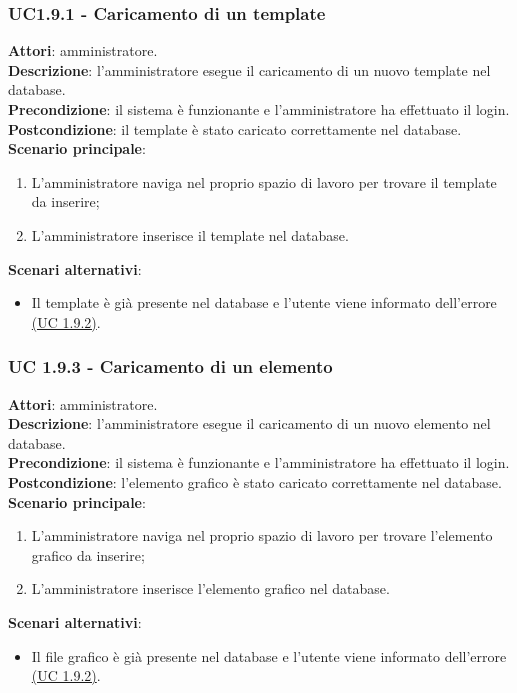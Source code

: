 \subsubsection{UC1.9.1 - Caricamento di un template}{
	\label{uc1.9.1}
	\textbf{Attori}: amministratore. \\
	\textbf{Descrizione}: l'amministratore esegue il caricamento di un nuovo template nel database. \\
	\textbf{Precondizione}: il sistema  è funzionante e l'amministratore ha effettuato il login.	\\
	\textbf{Postcondizione}: il template è stato caricato correttamente nel database.	\\
	\textbf{Scenario principale}:
	\begin{enumerate}
		\item L'amministratore naviga nel proprio spazio di lavoro  per trovare il template da inserire;
		\item L'amministratore inserisce il template nel database.
	\end{enumerate}
	\textbf{Scenari alternativi}:
	\begin{itemize}
		\item Il template è già presente nel database e l'utente viene informato dell'errore \hyperref[uc1.9.2]{(UC 1.9.2)}.
	\end{itemize}
	}
\subsubsection{UC 1.9.3 - Caricamento di un elemento}{
	\label{uc1.9.3}
	\textbf{Attori}: amministratore. \\
	\textbf{Descrizione}: l'amministratore esegue il caricamento di un nuovo elemento nel database. \\
	\textbf{Precondizione}: il sistema  è funzionante e l'amministratore ha effettuato il login.	\\
	\textbf{Postcondizione}: l'elemento grafico è stato caricato correttamente nel database.	\\
	\textbf{Scenario principale}:
	\begin{enumerate}
		\item L'amministratore naviga nel proprio spazio di lavoro per trovare l'elemento grafico da inserire;
		\item L'amministratore inserisce l'elemento grafico nel database.
	\end{enumerate}
	\textbf{Scenari alternativi}:
	\begin{itemize}
		\item Il file grafico è già presente nel database e l'utente viene informato dell'errore \hyperref[uc1.9.2]{(UC 1.9.2)}.
	\end{itemize}
	}
